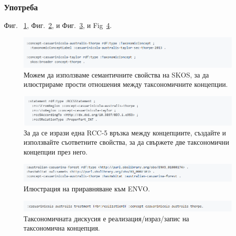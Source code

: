 \subsubsection{Употреба} Фиг.~ \ref{example-simple-taxonomic-concept-relationships}, Фиг.~\ref{example-rcc5-taxonomic-concept-relationships}, и Фиг.~\ref{example-envo}, и  Fig~\ref{example-treatment-concept}.

\begin{figure}[h!]
\centering
  \includegraphics[width=\textwidth]{Figures/example-simple-taxonomic-concept-relationships}
  \decoRule
  \caption[Example simple taxonomic concept relationships.]
  {Можем да използваме семантичните свойства на SKOS, за да илюстрираме прости отношения между таксономичните концепции.}
  \label{example-simple-taxonomic-concept-relationships}
\end{figure}

\begin{figure}[h!]
\centering
  \includegraphics[width=\textwidth]{Figures/example-rcc5-taxonomic-concept-relationships}
  \decoRule
  \caption[Example of RCC-5 taxonomic concept relationships.]{За да се изрази една RCC-5 връзка между концепциите, създайте  и използвайте съответните свойства, за да свържете две таксономични концепции през него.}
  \label{example-rcc5-taxonomic-concept-relationships}
\end{figure}


\begin{figure}[h!]
\centering
  \includegraphics[width=\textwidth]{Figures/example-envo.png}
  \decoRule
  \caption[Example of combining ENVO with OpenBiodiv-O.]{Илюстрация на приравняване към ENVO.}
  \label{example-envo}
\end{figure}



\begin{figure}[h!]
\centering
  \includegraphics[width=\textwidth]{Figures/example-treatment-concept}
  \decoRule
  \caption[Example connection between a treatment and a taxonomic concept.]{Таксономичната дискусия е реализация/израз/запис на таксономична концепция.}
  \label{example-treatment-concept}
\end{figure}

